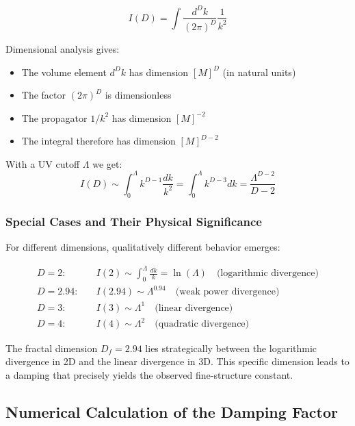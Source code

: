 \documentclass[12pt,a4paper]{article}
\theoremstyle{definition}
\begin{document}
	\begin{equation}
		I(D) = \int \frac{d^D k}{(2\pi)^D} \frac{1}{k^2}
	\end{equation}
	
	Dimensional analysis gives:
	\begin{itemize}
		\item The volume element $d^D k$ has dimension $[M]^D$ (in natural units)
		\item The factor $(2\pi)^D$ is dimensionless
		\item The propagator $1/k^2$ has dimension $[M]^{-2}$
		\item The integral therefore has dimension $[M]^{D-2}$
	\end{itemize}
	
	With a UV cutoff $\Lambda$ we get:
	\begin{equation}
		I(D) \sim \int_0^{\Lambda} k^{D-1} \frac{dk}{k^2} = \int_0^{\Lambda} k^{D-3} dk = \frac{\Lambda^{D-2}}{D-2}
	\end{equation}
	
	\subsubsection{Special Cases and Their Physical Significance}
	
	For different dimensions, qualitatively different behavior emerges:
	
	\begin{align}
		D = 2: \quad &I(2) \sim \int_0^{\Lambda} \frac{dk}{k} = \ln(\Lambda) \quad \text{(logarithmic divergence)}\\
		D = 2.94: \quad &I(2.94) \sim \Lambda^{0.94} \quad \text{(weak power divergence)}\\
		D = 3: \quad &I(3) \sim \Lambda^{1} \quad \text{(linear divergence)}\\
		D = 4: \quad &I(4) \sim \Lambda^{2} \quad \text{(quadratic divergence)}
	\end{align}
	
	The fractal dimension $D_f = 2.94$ lies strategically between the logarithmic divergence in 2D and the linear divergence in 3D. This specific dimension leads to a damping that precisely yields the observed fine-structure constant.
	
	\subsection{Numerical Calculation of the Damping Factor}
	
\end{document}
